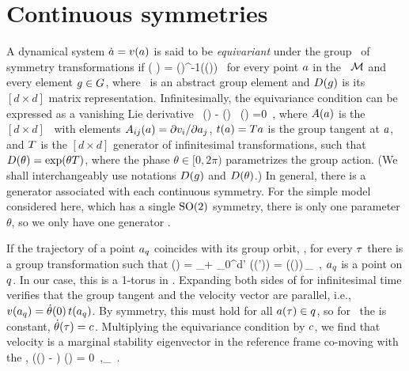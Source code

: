 \documentclass[aip,cha,
reprint,
secnumarabic,
nofootinbib, tightenlines,
nobibnotes, showkeys, showpacs,
superscriptaddress,
]{revtex4-1}
\begin{document}
\section{Continuous symmetries}
\label{s:symm}

A dynamical system $\dot{a}={v}(a)$ is said to be
\emph{equivariant} under the group \Group\ of symmetry transformations if
\beq
   \vel( \ssp )
    =  \matrixRep(\LieEl)^{-1}\vel(\matrixRep(\LieEl)\ssp)
   \,
for every point $a$ in the \statesp\ ${\cal M}$ and every element $g \in
G$, where \LieEl\ is an abstract group element and
${D}(g)$ is its $[d\!\times\!d]$ matrix representation.
Infinitesimally, the equivariance condition  can be expressed as
a vanishing Lie derivative
\beq
  \Lg \, \vel(\ssp)  - \Mvar(\ssp) \, \groupTan(\ssp) =0
  \,,
where
${A}(a)$ is the $[d\!\times\!d]$ \stabmat\, with elements
${A}_{ij}(a)={\partial {v}_i}/{\partial a_j}$, $ t(a)
= {T} a $ is the group tangent at $a$, and ${T}$ is the
$[d\!\times\!d]$ generator of infinitesimal transformations, such that
${D}(\theta) = \exp(\theta{T})$, where the phase $\theta \in [0,2\pi)$
parametrizes the group action. (We shall interchangeably use notations
${D}(g)$ and ${D}(\theta)$.) In general, there is a
generator associated with each continuous symmetry. For the simple model
considered here, which has a single $\textrm{SO}(2)$ symmetry, there is only one
parameter $\theta$, so we only have one generator \Lg.

If the trajectory of a point $a_q$ coincides with its group
orbit, \ie, for every $\tau$ there is a group transformation such that
\beq
\ssp (\zeit)
    = \ssp_\stagn + \int_0^\zeit \!\!d\zeit' \vel(\ssp (\zeit'))
    = \matrixRep(\theta (\zeit))\,\ssp_\stagn
  \,,
$a_q$ is a point on \emph{\reqv} $q$. In our case, this is a
1-torus in \statesp. Expanding both sides of  for infinitesimal time
verifies that the group tangent and the velocity vector are parallel, i.e.,
 ${v}(a_q) = \dot{\theta}(0) \, t(a_q)$.
By symmetry, this must hold for all $a(\tau) \in q$, so for \reqva\
the \emph{\phaseVel} is constant, $\dot{\theta}(\tau) = c$.
Multiplying the equivariance condition \refeq{inftmInv} by $c$, we
find that velocity is a marginal stability eigenvector in the reference frame co-moving
with the \reqv,
\beq
(\Mvar (\ssp) - \velRel \Lg) \vel (\ssp) = 0
\,,\qquad \ssp \in \pS_\stagn
\,.
\end{document}

